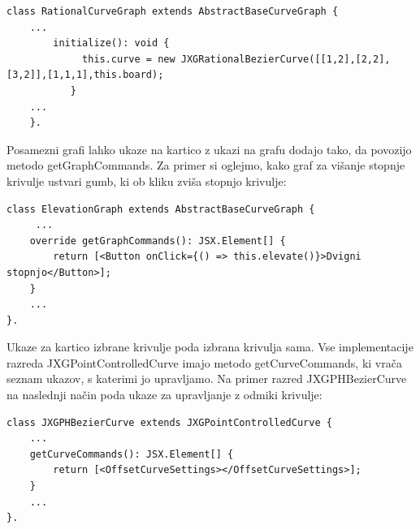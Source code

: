 \documentclass[isrm2, tisk]{fmfdelo}
\begin{document}
    \begin{lstlisting}[label={lst:ghdfg}]
    class RationalCurveGraph extends AbstractBaseCurveGraph {
    ...
        initialize(): void {
             this.curve = new JXGRationalBezierCurve([[1,2],[2,2],[3,2]],[1,1,1],this.board);
           }
    ...
    }.
    \end{lstlisting}
    Posamezni grafi lahko ukaze na kartico z ukazi na grafu dodajo tako, da povozijo metodo getGraphCommands.
    Za primer si oglejmo, kako graf za višanje stopnje krivulje ustvari gumb, ki ob kliku zviša stopnjo krivulje:
    \begin{lstlisting}[label={lst:ghdfssg}]
 class ElevationGraph extends AbstractBaseCurveGraph {
     ...
    override getGraphCommands(): JSX.Element[] {
        return [<Button onClick={() => this.elevate()}>Dvigni stopnjo</Button>];
    }
    ...
}.
    \end{lstlisting}
    Ukaze za kartico izbrane krivulje poda izbrana krivulja sama.
    Vse implementacije razreda JXGPointControlledCurve imajo metodo getCurveCommands, ki vrača seznam ukazov, s katerimi jo upravljamo.
    Na primer razred JXGPHBezierCurve na naslednji način poda ukaze za upravljanje z odmiki krivulje:
    \begin{lstlisting}[label={lst:ghdfs1sg}]
class JXGPHBezierCurve extends JXGPointControlledCurve {
    ...
    getCurveCommands(): JSX.Element[] {
        return [<OffsetCurveSettings></OffsetCurveSettings>];
    }
    ...
}.
    \end{lstlisting}
\end{document}
